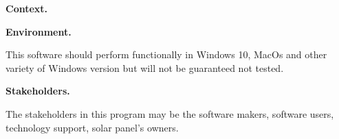 \documentclass{article}
\begin{document}
\medskip
\medskip

{\Large\textbf  {Context. }}

\medskip

{\textbf  {Environment. }}
\medskip

This software should perform functionally in Windows 10, MacOs and other variety of Windows version but will not be guaranteed not tested.

\medskip

{\textbf  {Stakeholders. }}

\medskip

The stakeholders in this program may be the software makers, software users, technology support, solar panel's owners. 

\iffalse Put your problem statement here.  Comments to you can be added, like this:

\wss{comment}

You can also leave comments for yourself, like this:

\an{comment} \fi
\end{document}
